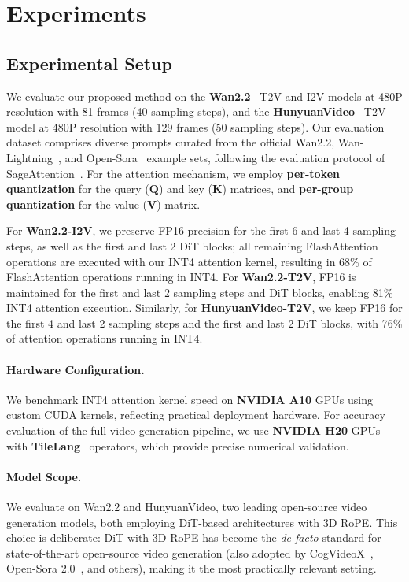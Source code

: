 
\section{Experiments}
\label{sec:experiments}




\subsection{Experimental Setup}
We evaluate our proposed method on the \textbf{Wan2.2}~\cite{wan2025wan} T2V and I2V models at 480P resolution with 81 frames (40 sampling steps), and the \textbf{HunyuanVideo}~\cite{kong2024hunyuanvideo} T2V model at 480P resolution with 129 frames (50 sampling steps). Our evaluation dataset comprises diverse prompts curated from the official Wan2.2, Wan-Lightning~\cite{fan2025wanlighting}, and Open-Sora~\cite{zheng2024opensora} example sets, following the evaluation protocol of SageAttention~\cite{zhang2025sageattention1}. For the attention mechanism, we employ \textbf{per-token quantization} for the query ($\mathbf{Q}$) and key ($\mathbf{K}$) matrices, and \textbf{per-group quantization} for the value ($\mathbf{V}$) matrix.

For \textbf{Wan2.2-I2V}, we preserve FP16 precision for the first 6 and last 4 sampling steps, as well as the first and last 2 DiT blocks; all remaining FlashAttention operations are executed with our INT4 attention kernel, resulting in 68\% of FlashAttention operations running in INT4. For \textbf{Wan2.2-T2V}, FP16 is maintained for the first and last 2 sampling steps and DiT blocks, enabling 81\% INT4 attention execution. Similarly, for \textbf{HunyuanVideo-T2V}, we keep FP16 for the first 4 and last 2 sampling steps and the first and last 2 DiT blocks, with 76\% of attention operations running in INT4.

\paragraph{\textbf{Hardware Configuration.}} We benchmark INT4 attention kernel speed on \textbf{NVIDIA A10} GPUs using custom CUDA kernels, reflecting practical deployment hardware. For accuracy evaluation of the full video generation pipeline, we use \textbf{NVIDIA H20} GPUs with \textbf{TileLang}~\cite{wang2025tilelang} operators, which provide precise numerical validation. 


\paragraph{\textbf{Model Scope.}} We evaluate on Wan2.2 and HunyuanVideo, two leading open-source video generation models, both employing DiT-based architectures with 3D RoPE. This choice is deliberate: DiT with 3D RoPE has become the \emph{de facto} standard for state-of-the-art open-source video generation (also adopted by CogVideoX~\cite{yang2024cogvideox}, Open-Sora 2.0~\cite{peng2025open}, and others), making it the most practically relevant setting. 

